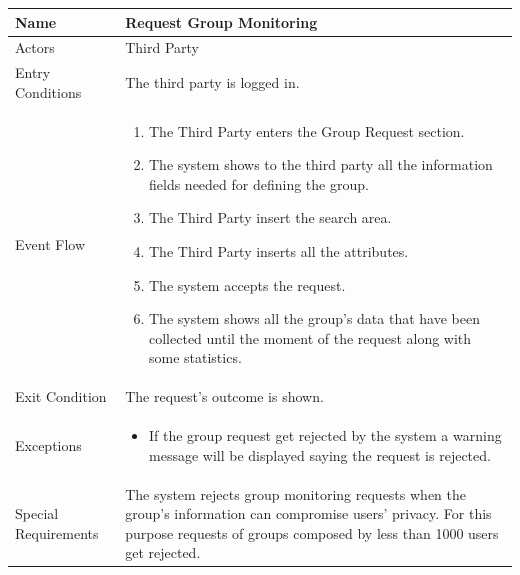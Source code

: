 \begin{enumerate}
\FloatBarrier
\begin{table}[h]
\begin{tabular}{|l|p{}|}
\hline
Name             & Request Group Monitoring \\ \hline
Actors           & Third Party  \\ \hline
Entry Conditions & The third party is logged in.    \\ \hline
Event Flow       & \begin{enumerate}
            \item The Third Party enters the Group Request section.
            \item The system shows to the third party all the information fields needed for defining the group.
            \item The Third Party insert the search area.
            \item The Third Party inserts all the attributes.
            \item The system accepts the request.
            \item The system shows all the group's data that have been collected until the moment of the request along with some statistics. 
        \end{enumerate}\\ \hline
Exit Condition   & The request's outcome is shown.\\ \hline
Exceptions       & \begin{itemize}
\item If the group request get rejected by the system a warning message will be displayed saying the request is rejected.
\end{itemize}\\ \hline
Special Requirements & The system rejects group monitoring requests when the group's information can compromise users' privacy. For this purpose requests of groups composed by less than 1000 users get rejected.
\\ \hline
\end{tabular}
\end{table}
\FloatBarrier
\clearpage


\end{enumerate}
